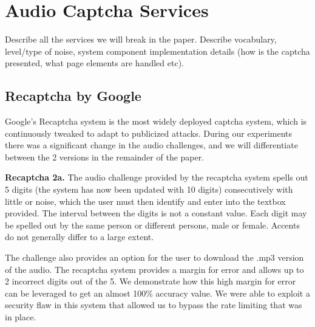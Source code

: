 \section{Audio Captcha Services}
\label{sec:services}

Describe all the services we will break in the paper. Describe vocabulary, level/type of noise,
system component implementation details (how is the captcha presented, what page elements are handled etc).

\subsection{Recaptcha by Google}

Google's Recaptcha system is the most widely deployed captcha system, which is continuously tweaked to 
adapt to publicized attacks. During our experiments there was a significant change in the audio challenges,
and we will differentiate between the 2 versions in the remainder of the paper.


\textbf{Recaptcha 2a.}
The audio challenge provided by the recaptcha system spells out 5 digits (the system has now been updated with 
10 digits) consecutively with little or noise, which the user must then identify and enter into the textbox provided. 
The interval between the digits is not a constant value. Each digit may be spelled out by the same person or different 
persons, male or female. Accents do not generally differ to a large extent.

The challenge also provides an option for the user to download the .mp3 version of the audio. The recaptcha system provides 
a margin for error and allows up to 2 incorrect digits out of the 5. We demonstrate how this high margin for error can be 
leveraged to get an almost 100\% accuracy value. We were able to exploit a security flaw in this system that allowed us to 
bypass the rate limiting that was in place.

